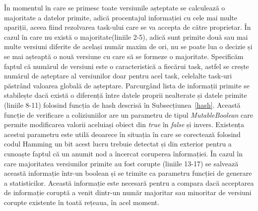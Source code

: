 \documentclass[12pt,a4paper]{report}
\begin{document}
În momentul în care se primesc toate versiunile așteptate se calculează o majoritate a datelor primite, adică procentajul informației cu cele mai multe apariții, aceea fiind rezolvarea task-ului care se va accepta de către proprietar. În cazul în care nu există o majoritate(liniile 2-5), adică sunt primite două sau mai multe versiuni diferite de același număr maxim de ori, nu se poate lua o decizie și se mai așteaptă o nouă versiune cu care să se formeze o majoritate. Specificăm faptul că numărul de versiuni este o caracteristică a fiecărui task, astfel se crește numărul de așteptare al versiunilor doar pentru acel task, celelalte task-uri păstrând valoarea globală de așteptare. Parcurgând lista de informații primite se stabilește dacă există o diferență între datele proprii nealterate și datele primite (liniile 8-11) folosind funcția de hash descrisă în Subsecțiunea~\ref{hash}. Această funcție de verificare a coliziuniilor are un parametru de tipul \textit{MutableBoolean} care permite modificarea valorii aceluiași obiect din \textit{true} în \textit{false} și invers. Existența acestui parametru este utilă deoarece în situația în care se corectează folosind codul Hamming un bit acest lucru trebuie detectat și din exterior pentru a cunoaște faptul că un anumit nod a încercat coruperea înformației. În cazul în care majoritatea versiunilor primite au fost corupte (liniile 13-17) se salvează această informație într-un boolean și se trimite ca parametru funcției de generare a statisticilor. Această informație este necesară pentru a compara dacă acceptarea de informație coruptă a venit dintr-un număr majoritar sau minoritar de versiuni corupte existente în toată rețeaua, în acel moment.
\end{document}

